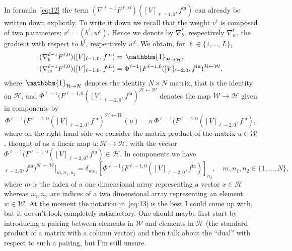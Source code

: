 \documentclass[10pt, a4paper]{article}
\theoremstyle{plain}
\theoremstyle{definition}
\theoremstyle{definition}
\theoremstyle{definition}
\theoremstyle{definition}
\theoremstyle{definition}
\theoremstyle{definition}
\theoremstyle{definition}
\theoremstyle{remark}
\theoremstyle{remark}
\theoremstyle{rudin-style-generic}
\theoremstyle{rudin-style-generic*}
\theoremstyle{rudin-style-theorem}
\newcommand{\id}{\,\mathbbm{1}}
\newcommand*{\fin}{{f^{\text{in}}}}
\begin{document}
  In formula~\eqref{eq:12} the term $ (\nabla^{\ell-1}  F^{\ell,0})([V]_{\ell-1,0} , \fin )$ can already be written down explicitly.
  To write it down we recall that the weight $v^\ell$ is composed of two parameters:  $v^\ell=(b^\ell,w^\ell)$.
  Hence we denote by $\nabla^\ell_b$, respectively $\nabla^\ell_w$, the gradient with respect to $b^\ell$, respectively $w^\ell$.
  We obtain, for $\ell\in\{1,\dots,L\}$,
  \begin{equation}\label{eq:13}
    \begin{aligned}
      (\nabla^{\ell-1}_b  F^{\ell,0})([V]_{\ell-1,0} , \fin ) &= \id_{\mathcal H\rightarrow\mathcal H} ,\\
      (\nabla^{\ell-1}_w  F^{\ell,0})([V]_{\ell-1,0} , \fin ) &= \Phi^{\ell-1}(  F^{\ell-1,0}([V]_{\ell-2,0}, \fin  )^{\mathcal H\leftarrow\mathcal W}
                                                                ,
    \end{aligned}
  \end{equation}
  where $\id_{\mathcal H\rightarrow\mathcal H}$ denotes the identity $N\times N$ matrix, that is the identity on $\mathcal H$,
  and $\Phi^{\ell-1}(  F^{\ell-1,0}([V]_{\ell-2,0}, \fin  )^{\mathcal H\leftarrow\mathcal W}$ denotes the map $\mathcal W\rightarrow\mathcal H$
  given in components by
  \begin{equation*}
    \Phi^{\ell-1}(  F^{\ell-1,0}([V]_{\ell-2,0}, \fin  )^{\mathcal H\leftarrow\mathcal W} ( u ) 
    =  u \, \Phi^{\ell-1}(  F^{\ell-1,0}([V]_{\ell-2,0}, \fin  ) ,
  \end{equation*}
  where on the right-hand side we consider the matrix product of the matrix $u\in\mathcal W$, thought of as a linear map $u:\mathcal H\rightarrow\mathcal H$,
  with the vector $\Phi^{\ell-1}(  F^{\ell-1,0}([V]_{\ell-2,0}, \fin  ) \in\mathcal H$.
  In components we have
  \begin{equation*}
    [    \Phi^{\ell-1}(  F^{\ell-1,0}([V]_{\ell-2,0}, \fin  )^{\mathcal H\leftarrow\mathcal W} ]_{m, n_1, n_2} = \delta_{m n_1}  [ \Phi^{\ell-1}(  F^{\ell-1,0}([V]_{\ell-2,0}, \fin  ) ]_{n_2}
    ,\quad m,  n_1, n_2\in\{ 1,\dots, N\}
    ,
  \end{equation*}
  where $m$ is  the index of a one dimensional array representing a vector $x\in\mathcal H$ whereas
  $n_1, n_2$ are indices of a two dimensional array representing an element $w\in\mathcal W$.
  At the moment the notation in~\eqref{eq:13} is the best I could come up with, but it doesn't look completely satisfactory.
  One should maybe first start by introducing a pairing between elements in $\mathcal W$ and elements in $\mathcal H$
  (the standard product of a matrix with a column vector) and then talk about the ``dual'' with respect to such a pairing,
  but I'm still unsure.
\end{document}

